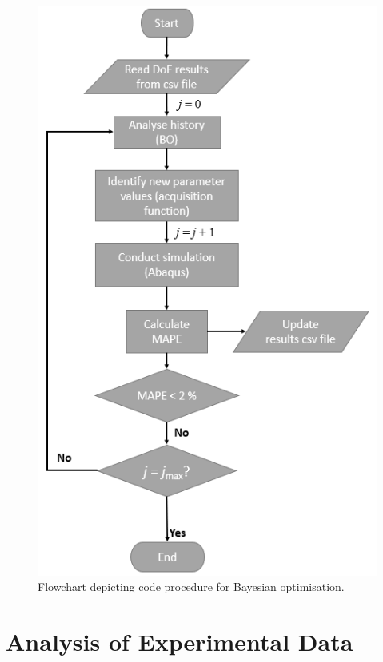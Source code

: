 \documentclass[preprint, review, 12pt]{elsarticle}
\begin{document}
	\begin{figure}[!htbp]
		\centering
		\includegraphics[width=\linewidth, height=0.8\textheight, keepaspectratio]{BO_FLOWCHART}
		\caption{Flowchart depicting code procedure for Bayesian optimisation.}
		\label{fig:bo_flowchart}
	\end{figure}

	\section{Analysis of Experimental Data}
	\label{h:tensile_tests}
\end{document}
